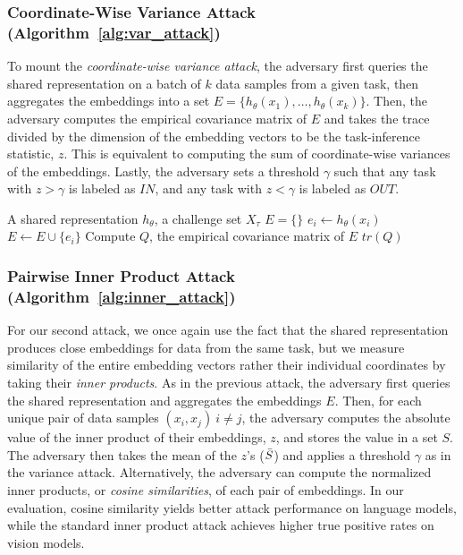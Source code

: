 \subsubsection{Coordinate-Wise Variance Attack (Algorithm~\ref{alg:var_attack})} To mount the \textit{coordinate-wise variance attack}, the adversary first queries the shared representation on a batch of $k$ data samples from a given task, then aggregates the embeddings into a set $E = \{ h_\theta(x_1), \dots, h_\theta(x_k) \}$. Then, the adversary computes the empirical covariance matrix of $E$ and takes the trace divided by the dimension of the embedding vectors to be the task-inference statistic, $z$. This is equivalent to computing the sum of coordinate-wise variances of the embeddings. Lastly, the adversary sets a threshold $\gamma$ such that any task with $z > \gamma$ is labeled as $IN$, and any task with $z < \gamma$ is labeled as $OUT$.

\begin{algorithm}[H]
    \caption{Coordinate-Wise Variance Attack}
    \label{alg:var_attack}
    \begin{algorithmic}[1]
        A shared representation $h_\theta$, a challenge set  $X_\tau$
       \State $E = \{ \}$ 
           \State $e_i \gets h_\theta(x_i)$ 
           \State $E \gets E \cup \{ e_i \}$
       \EndFor
       \State Compute $Q$, the empirical covariance matrix of $E$
       \State \Return $tr(Q)$ 
    \end{algorithmic}
\end{algorithm}


\subsubsection{Pairwise Inner Product Attack (Algorithm~\ref{alg:inner_attack})} For our second attack, we once again use the fact that the shared representation produces close embeddings for data from the same task, but we measure similarity of the entire embedding vectors rather their individual coordinates by taking their \textit{inner products}. As in the previous attack, the adversary first queries the shared representation and aggregates the embeddings $E$. Then, for each unique pair of data samples $(x_i, x_j) \: i \neq j$, the adversary computes the absolute value of the inner product of their embeddings, $z$, and stores the value in a set $S$. The adversary then takes the mean of the $z$'s ($\Bar{S}$) and applies a threshold $\gamma$ as in the variance attack. Alternatively, the adversary can compute the normalized inner products, or \emph{cosine similarities}, of each pair of embeddings. In our evaluation, cosine similarity yields better attack performance on language models, while the standard inner product attack achieves higher true positive rates on vision models.




